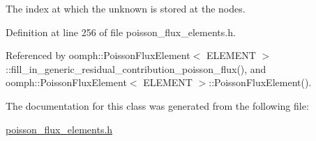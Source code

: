 The index at which the unknown is stored at the nodes. 



Definition at line 256 of file poisson\+\_\+flux\+\_\+elements.\+h.



Referenced by oomph\+::\+Poisson\+Flux\+Element$<$ E\+L\+E\+M\+E\+N\+T $>$\+::fill\+\_\+in\+\_\+generic\+\_\+residual\+\_\+contribution\+\_\+poisson\+\_\+flux(), and oomph\+::\+Poisson\+Flux\+Element$<$ E\+L\+E\+M\+E\+N\+T $>$\+::\+Poisson\+Flux\+Element().



The documentation for this class was generated from the following file\+:\begin{DoxyCompactItemize}
\item 
\hyperlink{poisson__flux__elements_8h}{poisson\+\_\+flux\+\_\+elements.\+h}\end{DoxyCompactItemize}
